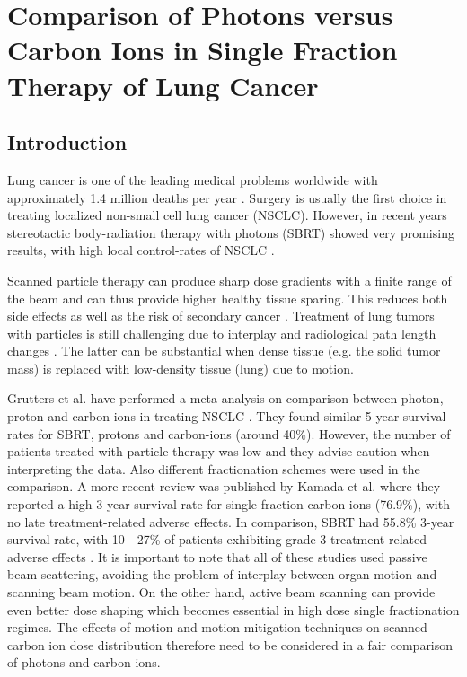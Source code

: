 \documentclass[type=dr, dr=rernat, acm$^3$entcolor=tud7b,colorbacktitle, bigchapter, openright, twoside, 12pt ]{tudthesis}
\begin{document}
\chapter{Comparison of Photons versus Carbon Ions in Single Fraction Therapy of Lung Cancer}
\label{PatStudy}


\section{Introduction}

Lung cancer is one of the leading medical problems worldwide with approximately 1.4 million deaths per year \cite{Siegel2014}. Surgery is usually the first choice in treating localized non-small cell lung cancer (NSCLC). However, in recent years stereotactic body-radiation therapy with photons (SBRT) showed very promising results, with high local control-rates of NSCLC \cite{Baumann2009, Fakiris2009, Grutters2010, Ricardi2010, Timmerman2010, Greco2011}.

Scanned particle therapy can produce sharp dose gradients with a finite range of the beam and can thus provide higher healthy tissue sparing. This reduces both side effects as well as the risk of secondary cancer \cite{Newhauser2011}. Treatment of lung tumors with particles is still challenging due to interplay and radiological path length changes \cite{Bert2011}.
The latter can be substantial when dense tissue (e.g. the solid tumor mass) is replaced with low-density tissue (lung) due to motion.

Grutters et al. have performed a meta-analysis on comparison between photon, proton and carbon ions in treating NSCLC \cite{Grutters2010}.
They found similar 5-year survival rates for SBRT, protons and carbon-ions (around 40\%). However, the number of patients treated with
particle therapy was low and they advise caution when interpreting the data. Also different fractionation schemes were used in the
comparison. A more recent review was published by  Kamada et al. \cite{Kamada2016} where they reported a high 3-year survival rate for
single-fraction carbon-ions (76.9\%), with no late treatment-related adverse effects. In comparison, SBRT had 55.8\% 3-year survival rate,
with 10 - 27\% of patients exhibiting grade 3 treatment-related adverse effects \cite{Timmerman2010}. It is important to note that all
of these studies used passive beam scattering, avoiding the problem of interplay between organ motion and scanning beam motion.
On the other hand, active beam scanning can provide even better dose shaping which becomes essential in high dose single fractionation
regimes. The effects of motion and motion mitigation techniques on scanned carbon ion dose distribution therefore need to be considered 
in a fair comparison of photons and carbon ions. 
\end{document}
